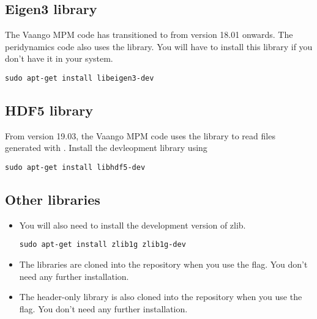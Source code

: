 \documentclass[11pt,fleqn]{book} %
\begin{document}
\subsection{Eigen3 library}
The Vaango MPM code has transitioned to  from version 18.01 onwards.  The peridynamics code 
also uses the  library. You will have to install this library if you don't have it in your system.
\begin{lstlisting}[backgroundcolor=\color{background}]
sudo apt-get install libeigen3-dev
\end{lstlisting}

\subsection{HDF5 library}
From version 19.03, the Vaango MPM code uses the  library to read files generated 
with .  Install the devleopment library using
\begin{lstlisting}[backgroundcolor=\color{background}]
sudo apt-get install libhdf5-dev
\end{lstlisting}

\subsection{Other libraries}
\begin{itemize}
  \item You will also need to install the development version of zlib.
\begin{lstlisting}[backgroundcolor=\color{background}]
sudo apt-get install zlib1g zlib1g-dev
\end{lstlisting}
  \item The  libraries are cloned into the repository when you use
        the  flag.  You don't need any further installation.

  \item The  header-only library is also cloned into the repository when you use
        the  flag.  You don't need any further installation.
\end{itemize}
\end{document}
